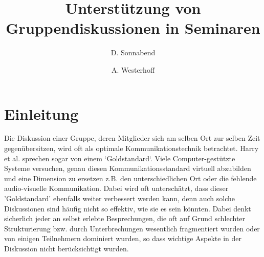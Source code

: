 \documentclass{seminarvorlage}
\begin{document}
\title{Unterstützung von Gruppendiskussionen in Seminaren}
\author{
  \alignauthor D. Sonnabend\\
    \and
  \alignauthor A. Westerhoff\\
}

\maketitle




\section{Einleitung}
Die Diskussion einer Gruppe, deren Mitglieder sich am selben Ort zur selben Zeit
gegenübersitzen, wird oft als optimale Kommunikationstechnik betrachtet. Harry
et al. \cite{HarGorSch2012} sprechen sogar von einem `Goldstandard`. Viele
Com\-puter-\-ge\-stützte Systeme versuchen, genau diesen
Kommunikationsstandard virtuell abzubilden und eine Dimension zu ersetzen z.B. den unterschiedlichen
Ort oder die fehlende audio-visuelle Kommunikation. Dabei wird oft unterschätzt,
dass dieser 'Goldstandard' ebenfalls weiter verbessert werden kann, denn auch
solche Diskussionen sind häufig nicht so effektiv, wie sie es sein könnten.
Dabei denkt sicherlich jeder an selbst erlebte Besprechungen, die oft auf Grund schlechter
Strukturierung bzw. durch Unterbrechungen wesentlich fragmentiert wurden oder
von einigen Teilnehmern dominiert wurden, so dass wichtige Aspekte in der
Diskussion nicht berücksichtigt wurden.
\end{document}
